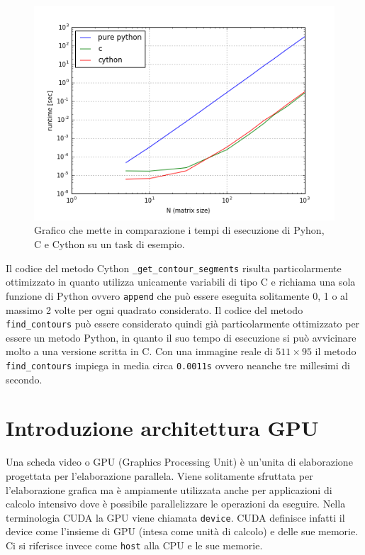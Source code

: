 \documentclass[12pt,a4paper]{report}
\begin{document}
\begin{figure}[H]
    \centering
    \includegraphics[scale=0.9]{img/cython-vs-c.png}
    \caption{Grafico che mette in comparazione i tempi di esecuzione di Pyhon, C e Cython su un task di esempio. 
}
\end{figure} 
Il codice del metodo Cython \verb|_get_contour_segments| risulta particolarmente ottimizzato in quanto utilizza unicamente variabili di tipo C e richiama una sola funzione di Python ovvero \verb|append| che può essere eseguita solitamente 0, 1 o al massimo 2 volte per ogni quadrato considerato. 
Il codice del metodo \verb|find_contours| può essere considerato quindi già particolarmente ottimizzato per essere un metodo Python, in quanto il suo tempo di esecuzione si può avvicinare molto a una versione scritta in C. \newline
Con una immagine reale di $511\times 95$ il metodo \verb|find_contours| impiega in media circa \verb|0.0011s| %
ovvero neanche tre millesimi di secondo.

\section{Introduzione architettura GPU}
Una scheda video o GPU (Graphics Processing Unit) è un'unita di elaborazione progettata per l'elaborazione parallela. Viene solitamente sfruttata per l'elaborazione grafica ma è ampiamente utilizzata anche per applicazioni di calcolo intensivo dove è possibile parallelizzare le operazioni da eseguire. \newline
Nella terminologia CUDA la GPU viene chiamata \verb|device|. CUDA definisce infatti il device come l'insieme di GPU (intesa come unità di calcolo) e delle sue memorie. Ci si riferisce invece come \verb|host| alla CPU e le sue memorie. \newline
\end{document}
